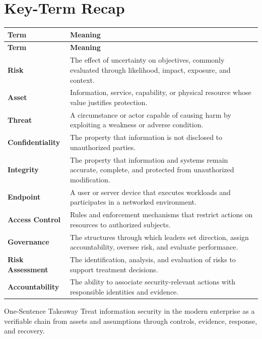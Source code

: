 \documentclass[11pt,letterpaper]{article}
\begin{document}
\section*{Key-Term Recap}
\begin{longtable}{>{\RaggedRight\arraybackslash}p{}>{\RaggedRight\arraybackslash}p{}}
\toprule\rowcolor{Navy}\color{white}\textbf{Term} & \color{white}\textbf{Meaning}\\\midrule
\endfirsthead
\toprule\rowcolor{Navy}\color{white}\textbf{Term} & \color{white}\textbf{Meaning}\\\midrule
\endhead
\textbf{Risk} & The effect of uncertainty on objectives, commonly evaluated through likelihood, impact, exposure, and context. \\\midrule
\textbf{Asset} & Information, service, capability, or physical resource whose value justifies protection. \\\midrule
\textbf{Threat} & A circumstance or actor capable of causing harm by exploiting a weakness or adverse condition. \\\midrule
\textbf{Confidentiality} & The property that information is not disclosed to unauthorized parties. \\\midrule
\textbf{Integrity} & The property that information and systems remain accurate, complete, and protected from unauthorized modification. \\\midrule
\textbf{Endpoint} & A user or server device that executes workloads and participates in a networked environment. \\\midrule
\textbf{Access Control} & Rules and enforcement mechanisms that restrict actions on resources to authorized subjects. \\\midrule
\textbf{Governance} & The structures through which leaders set direction, assign accountability, oversee risk, and evaluate performance. \\\midrule
\textbf{Risk Assessment} & The identification, analysis, and evaluation of risks to support treatment decisions. \\\midrule
\textbf{Accountability} & The ability to associate security-relevant actions with responsible identities and evidence. \\\midrule
\bottomrule
\end{longtable}
\begin{CornellExamBox}{One-Sentence Takeaway}
Treat information security in the modern enterprise as a verifiable chain from assets and assumptions through controls, evidence, response, and recovery.
\end{CornellExamBox}
\end{document}
